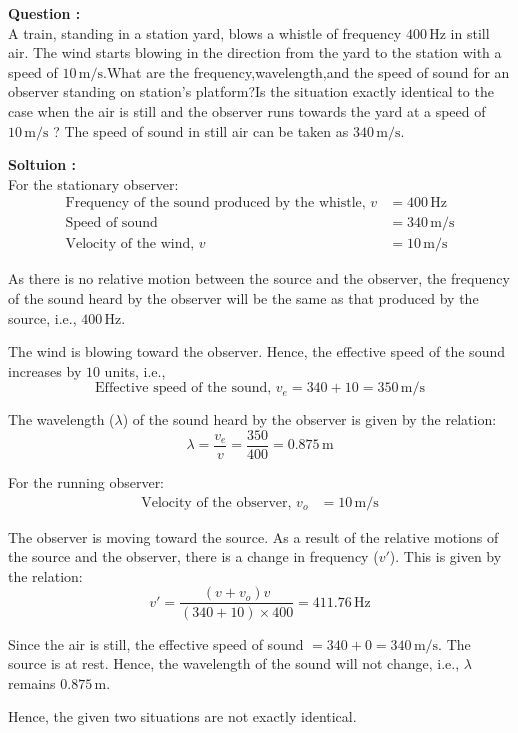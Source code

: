 \documentclass{article}
\begin{document}
\textbf{Question : }\\

A train, standing in a station yard, blows a whistle of frequency $400 \, \text{Hz}$ in still air. The wind starts blowing in the direction from the yard to the station with a speed of $10 \, \text{m/s}$.What are the frequency,wavelength,and the speed of sound for an observer standing on station's platform?Is the situation exactly identical to the case when the air is still and the observer runs towards the yard at a speed of $10\, \text{m/s}$ ? The speed of sound in still air can be taken as $340\, \text{m/s}$.


\textbf{Soltuion : }\\

For the stationary observer:
\begin{align*}
    \text{Frequency of the sound produced by the whistle, } v &= 400 \, \text{Hz} \\
    \text{Speed of sound} &= 340 \, \text{m/s} \\
    \text{Velocity of the wind, } v &= 10 \, \text{m/s}
\end{align*}

As there is no relative motion between the source and the observer, the frequency of the sound heard by the observer will be the same as that produced by the source, i.e., $400 \, \text{Hz}$.

The wind is blowing toward the observer. Hence, the effective speed of the sound increases by $10$ units, i.e.,
\[
\text{Effective speed of the sound, } v_e = 340 + 10 = 350 \, \text{m/s}
\]

The wavelength ($\lambda$) of the sound heard by the observer is given by the relation:
\[
\lambda = \frac{v_e}{v} = \frac{350}{400} = 0.875 \, \text{m}
\]

For the running observer:
\begin{align*}
    \text{Velocity of the observer, } v_o &= 10 \, \text{m/s}
\end{align*}

The observer is moving toward the source. As a result of the relative motions of the source and the observer, there is a change in frequency ($v'$). This is given by the relation:
\[
v' = \frac{(v + v_o)v}{(340 + 10) \times 400} = 411.76 \, \text{Hz}
\]

Since the air is still, the effective speed of sound $= 340 + 0 = 340 \, \text{m/s}$. The source is at rest. Hence, the wavelength of the sound will not change, i.e., $\lambda$ remains $0.875 \, \text{m}$.

Hence, the given two situations are not exactly identical.
\end{document}
